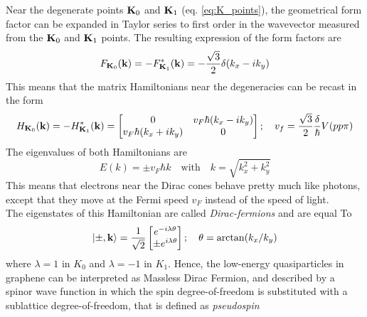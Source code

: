 Near the degenerate points $\mathbf{K}_0$ and $\mathbf{K}_1$ (eq. \ref{eq:K_points}), the geometrical form factor can be expanded in Taylor series to first order in the wavevector measured from the $\mathbf{K}_0$ and $\mathbf{K}_1$ points. The resulting expression of the form factors are
\begin{equation}
    F_{\mathbf{K}_0}(\mathbf{k})=-F^*_{\mathbf{K}_1}(\mathbf{k})= -\frac{\sqrt 3}2 \delta (k_x-ik_y)
    \label{eq:F(k)-approx}
\end{equation}
This means that the matrix Hamiltonians near the degeneracies can be recast in the form
\begin{equation}
    H_{\mathbf{K}_0}(\mathbf{k})=
    -H^*_{\mathbf{K}_1}(\mathbf{k})=
    \begin{bmatrix}
        0&v_F\hbar(k_x-ik_y)\\
        v_F\hbar(k_x+ik_y)&0
    \end{bmatrix};\quad
    v_f=\frac{\sqrt 3}2 \frac\delta \hbar V(pp\pi)
    \label{eq:dirac_Hamiltonian}
\end{equation}
The eigenvalues of both Hamiltonians are 
\begin{equation}
    E(k)=\pm v_F\hbar k \quad\text{with}\quad k=\sqrt{k_x^2+k_y^2}
\end{equation}
This means that electrons near the Dirac cones behave pretty much like photons, except that they move at the Fermi speed $v_F$ instead of the speed of light.\\
The eigenstates of this Hamiltonian are called \textit{Dirac-fermions} and are equal To
\begin{equation}
    \ket{\pm,\mathbf{k}}=\frac 1{\sqrt 2}
    \begin{bmatrix}
        e^{-i\lambda\theta}\\
        \pm e^{i\lambda\theta}
    \end{bmatrix};\quad \theta=\arctan(k_x/k_y)
\end{equation}
where $\lambda=1$ in $K_0$ and $\lambda=-1$ in $K_1$. Hence, the low-energy quasiparticles in graphene can be interpreted as Massless Dirac Fermion, and described by a spinor wave function in which the spin degree-of-freedom is substituted with a sublattice degree-of-freedom, that is defined as \textit{pseudospin}

